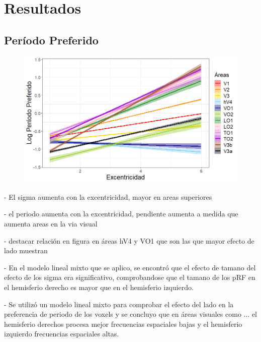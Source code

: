 \chapter{Resultados}\label{chapter:results}

\section{Per\'iodo Preferido}


\begin{figure}
	\centering
	\includegraphics[scale=0.6]{Graphics/pp_vs_eccen}
\end{figure}

- El sigma aumenta con la excentricidad, mayor en areas superiores

- el periodo aumenta con la excentricidad, pendiente aumenta a medida que aumenta areas en la via visual

- destacar relaci\'on en figura en \'areas hV4 y VO1 que son las que mayor efecto de lado muestran

- En el modelo lineal mixto que se aplico, se encontr\'o que el efecto de tamano del efecto de los sigma era significativo, comprobandose que el tamano de los pRF en el hemisferio derecho es mayor que en el hemisferio izquierdo.

- Se utiliz\'o un modelo lineal mixto para comprobar el efecto del lado en la preferencia de periodo de los voxels y se concluyo que en \'areas visuales como ... el hemisferio derechos procesa mejor frecuencias espaciales bajas y el hemisferio izquierdo frecuencias espaciales altas.





